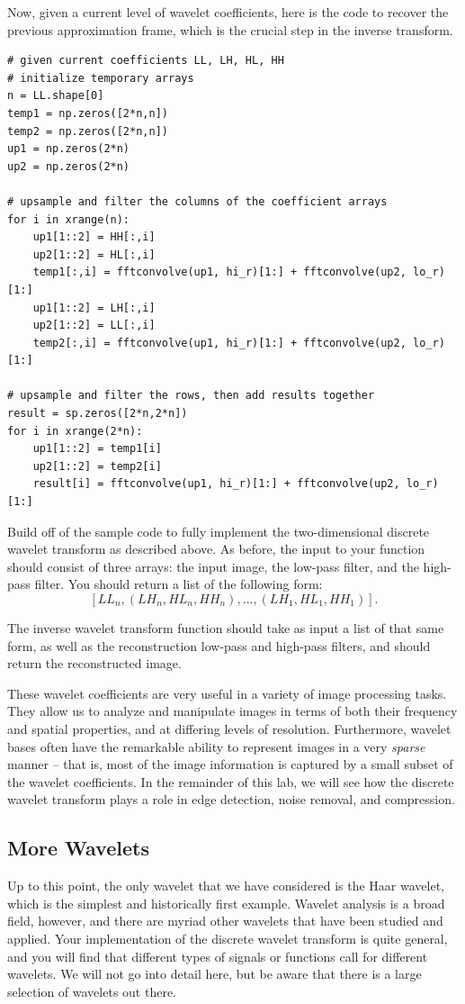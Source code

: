 Now, given a current level of wavelet coefficients, here is the code to recover the previous
approximation frame, which is the crucial step in the inverse transform.
\begin{lstlisting}
# given current coefficients LL, LH, HL, HH
# initialize temporary arrays
n = LL.shape[0]
temp1 = np.zeros([2*n,n])
temp2 = np.zeros([2*n,n])
up1 = np.zeros(2*n)
up2 = np.zeros(2*n)

# upsample and filter the columns of the coefficient arrays
for i in xrange(n):
	up1[1::2] = HH[:,i]
	up2[1::2] = HL[:,i]
	temp1[:,i] = fftconvolve(up1, hi_r)[1:] + fftconvolve(up2, lo_r)[1:]
	up1[1::2] = LH[:,i]
	up2[1::2] = LL[:,i]		
	temp2[:,i] = fftconvolve(up1, hi_r)[1:] + fftconvolve(up2, lo_r)[1:]

# upsample and filter the rows, then add results together
result = sp.zeros([2*n,2*n])
for i in xrange(2*n):
	up1[1::2] = temp1[i]
	up2[1::2] = temp2[i]
	result[i] = fftconvolve(up1, hi_r)[1:] + fftconvolve(up2, lo_r)[1:]
\end{lstlisting}

\begin{problem}
Build off of the sample code to fully implement the two-dimensional discrete
wavelet transform as described above.
As before, the input to your function should consist of
three arrays: the input image, the low-pass filter, and the high-pass filter.
You should return a list of the following form: $$[LL_n,(LH_n,HL_n,HH_n), \ldots
,(LH_1,HL_1,HH_1)].$$ 

The inverse wavelet transform function should take as input a list
of that same form, as well as the reconstruction low-pass and high-pass filters,
and should return the reconstructed image.
\end{problem}

These wavelet coefficients are very useful in a variety of image processing
tasks. They allow us to analyze and manipulate images in terms of both their
frequency and spatial properties, and at differing levels of resolution.
Furthermore, wavelet bases often have the remarkable ability to represent
images in a very \textit{sparse} manner -- that is, most of the image
information is captured by a small subset of the wavelet coefficients.
In the remainder of this lab, we will see how the discrete wavelet transform
plays a role in edge detection, noise removal, and compression.

\subsection*{More Wavelets}
Up to this point, the only wavelet that we have considered is the Haar wavelet,
which is the simplest and historically first example. Wavelet analysis is a broad
field, however, and there are myriad other wavelets that have been studied and
applied. Your implementation of the discrete wavelet transform is quite general,
and you will find that different types of signals or functions call for different
wavelets. We will not go into detail here, but be aware that there is a large
selection of wavelets out there.

